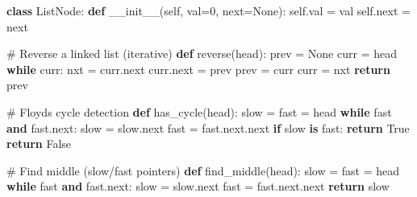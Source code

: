\documentclass[11pt]{article}
\newenvironment{Shaded}{\begin{snugshade}}{\end{snugshade}}
\newcommand{\BuiltInTok}[1]{\textcolor[rgb]{0.50,0.55,0.55}{#1}}
\newcommand{\CommentTok}[1]{\textcolor[rgb]{0.48,0.49,0.49}{#1}}
\newcommand{\ControlFlowTok}[1]{\textcolor[rgb]{0.99,0.74,0.29}{\textbf{#1}}}
\newcommand{\DecValTok}[1]{\textcolor[rgb]{0.96,0.45,0.00}{#1}}
\newcommand{\FunctionTok}[1]{\textcolor[rgb]{0.56,0.27,0.68}{#1}}
\newcommand{\KeywordTok}[1]{\textcolor[rgb]{0.81,0.81,0.76}{\textbf{#1}}}
\newcommand{\NormalTok}[1]{\textcolor[rgb]{0.81,0.81,0.76}{#1}}
\newcommand{\OperatorTok}[1]{\textcolor[rgb]{0.81,0.81,0.76}{#1}}
\newcommand{\VariableTok}[1]{\textcolor[rgb]{0.15,0.68,0.68}{#1}}
\begin{document}

\begin{Shaded}
\begin{Highlighting}[]
\KeywordTok{class}\NormalTok{ ListNode:}
    \KeywordTok{def} \FunctionTok{\_\_init\_\_}\NormalTok{(}\VariableTok{self}\NormalTok{, val}\OperatorTok{=}\DecValTok{0}\NormalTok{, }\BuiltInTok{next}\OperatorTok{=}\VariableTok{None}\NormalTok{):}
        \VariableTok{self}\NormalTok{.val }\OperatorTok{=}\NormalTok{ val}
        \VariableTok{self}\NormalTok{.}\BuiltInTok{next} \OperatorTok{=} \BuiltInTok{next}

\CommentTok{\# Reverse a linked list (iterative)}
\KeywordTok{def}\NormalTok{ reverse(head):}
\NormalTok{    prev }\OperatorTok{=} \VariableTok{None}
\NormalTok{    curr }\OperatorTok{=}\NormalTok{ head}
    \ControlFlowTok{while}\NormalTok{ curr:}
\NormalTok{        nxt }\OperatorTok{=}\NormalTok{ curr.}\BuiltInTok{next}
\NormalTok{        curr.}\BuiltInTok{next} \OperatorTok{=}\NormalTok{ prev}
\NormalTok{        prev }\OperatorTok{=}\NormalTok{ curr}
\NormalTok{        curr }\OperatorTok{=}\NormalTok{ nxt}
    \ControlFlowTok{return}\NormalTok{ prev}

\CommentTok{\# Floyd\textquotesingle{}s cycle detection}
\KeywordTok{def}\NormalTok{ has\_cycle(head):}
\NormalTok{    slow }\OperatorTok{=}\NormalTok{ fast }\OperatorTok{=}\NormalTok{ head}
    \ControlFlowTok{while}\NormalTok{ fast }\KeywordTok{and}\NormalTok{ fast.}\BuiltInTok{next}\NormalTok{:}
\NormalTok{        slow }\OperatorTok{=}\NormalTok{ slow.}\BuiltInTok{next}
\NormalTok{        fast }\OperatorTok{=}\NormalTok{ fast.}\BuiltInTok{next}\NormalTok{.}\BuiltInTok{next}
        \ControlFlowTok{if}\NormalTok{ slow }\KeywordTok{is}\NormalTok{ fast:}
            \ControlFlowTok{return} \VariableTok{True}
    \ControlFlowTok{return} \VariableTok{False}

\CommentTok{\# Find middle (slow/fast pointers)}
\KeywordTok{def}\NormalTok{ find\_middle(head):}
\NormalTok{    slow }\OperatorTok{=}\NormalTok{ fast }\OperatorTok{=}\NormalTok{ head}
    \ControlFlowTok{while}\NormalTok{ fast }\KeywordTok{and}\NormalTok{ fast.}\BuiltInTok{next}\NormalTok{:}
\NormalTok{        slow }\OperatorTok{=}\NormalTok{ slow.}\BuiltInTok{next}
\NormalTok{        fast }\OperatorTok{=}\NormalTok{ fast.}\BuiltInTok{next}\NormalTok{.}\BuiltInTok{next}
    \ControlFlowTok{return}\NormalTok{ slow}


\end{Highlighting}
\end{Shaded}
\end{document}
